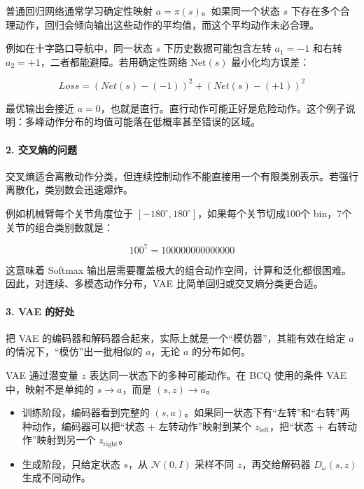 普通回归网络通常学习确定性映射 \(a=\pi(s)\)。如果同一个状态 \(s\) 下存在多个合理动作，回归会倾向输出这些动作的平均值，而这个平均动作未必合理。

例如在十字路口导航中，同一状态 \(s\) 下历史数据可能包含左转 \(a_1=-1\) 和右转 \(a_2=+1\)，二者都能避障。若用确定性网络 \(\mathrm{Net}(s)\) 最小化均方误差：

\[
Loss=(Net(s)-(-1))^{2}+(Net(s)-(+1))^{2}
\]

最优输出会接近 \(a=0\)，也就是直行。直行动作可能正好是危险动作。这个例子说明：多峰动作分布的均值可能落在低概率甚至错误的区域。

\hypertarget{ux4ea4ux53c9ux71b5ux7684ux95eeux9898}{%
\paragraph{2. 交叉熵的问题}\label{ux4ea4ux53c9ux71b5ux7684ux95eeux9898}}

交叉熵适合离散动作分类，但连续控制动作不能直接用一个有限类别表示。若强行离散化，类别数会迅速爆炸。

例如机械臂每个关节角度位于 \([-180^{\circ},180^{\circ}]\)，如果每个关节切成100个 bin，7个关节的组合类别数就是：

\[
100^{7} = 100000000000000
\]

这意味着 Softmax 输出层需要覆盖极大的组合动作空间，计算和泛化都很困难。因此，对连续、多模态动作分布，VAE 比简单回归或交叉熵分类更合适。

\hypertarget{vae-ux7684ux597dux5904}{%
\paragraph{3. VAE 的好处}\label{vae-ux7684ux597dux5904}}

把 VAE 的编码器和解码器合起来，实际上就是一个``模仿器''，其能有效在给定 \(a\) 的情况下，``模仿''出一批相似的 \(a\)，无论 \(a\) 的分布如何。

VAE 通过潜变量 \(z\) 表达同一状态下的多种可能动作。在 BCQ 使用的条件 VAE 中，映射不是单纯的 \(s\to a\)，而是 \((s,z)\to a\)。

\begin{itemize}
\tightlist
\item
  训练阶段，编码器看到完整的 \((s,a)\)。如果同一状态下有``左转''和``右转''两种动作，编码器可以把``状态 + 左转动作''映射到某个 \(z_{\mathrm{left}}\)，把``状态 + 右转动作''映射到另一个 \(z_{\mathrm{right}}\)。
\item
  生成阶段，只给定状态 \(s\)，从 \(\mathcal{N}(0,I)\) 采样不同 \(z\)，再交给解码器 \(D_\omega(s,z)\) 生成不同动作。
\end{itemize}


